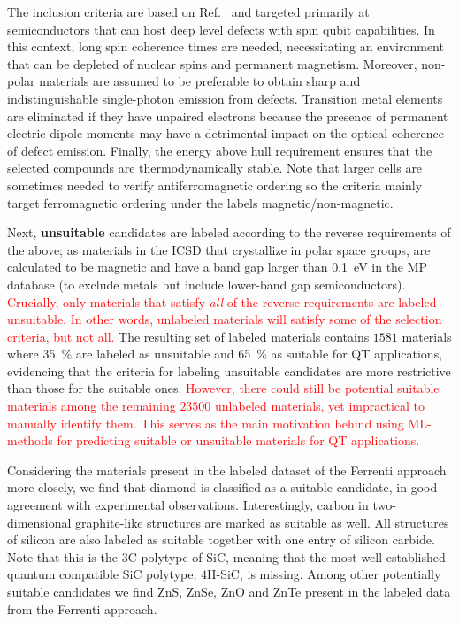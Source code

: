\documentclass[superscriptaddress,
preprint,
 amsmath,amssymb,
 aps,
]{revtex4-2}
\newcommand{\mrk}[1]{\textcolor{red}{#1}}
\begin{document}
The inclusion criteria are based on Ref.~\cite{Weber2010} and targeted primarily at semiconductors that can host deep level defects with spin qubit capabilities. In this context, long spin coherence times are needed, necessitating an environment that can be depleted of nuclear spins and permanent magnetism. 
Moreover, non-polar materials are assumed to be preferable to obtain sharp and indistinguishable single-photon emission from defects.  
Transition metal elements are eliminated if they have unpaired electrons because the presence of permanent electric dipole moments may have a detrimental impact on the optical coherence of defect emission. 
Finally, the energy above hull requirement ensures that the selected compounds are thermodynamically stable.
Note that larger cells are sometimes needed to verify antiferromagnetic ordering so the criteria mainly target ferromagnetic ordering under the labels magnetic/non-magnetic.

Next, \textbf{unsuitable} candidates are labeled according to the reverse requirements of the above; as materials in the ICSD that crystallize in polar space groups, are calculated to be magnetic and have a band gap larger than \SI{0.1}{\electronvolt} in the MP database (to exclude metals but include lower-band gap semiconductors).
\mrk{Crucially, only materials that satisfy \emph{all} of the reverse requirements are labeled unsuitable.
In other words, unlabeled materials will satisfy some of the selection criteria, but not all.}
The resulting set of labeled materials contains $1581$ materials where \SI{35}{\percent}
are labeled as unsuitable and \SI{65}{\percent} 
as suitable for QT applications, evidencing that 
the criteria for labeling unsuitable candidates are more restrictive than those for the suitable ones. \mrk{However, there could still be potential suitable materials among the remaining $23500$ unlabeled materials, yet impractical to manually identify them. This serves as the main motivation behind using ML-methods for predicting suitable or unsuitable materials for QT applications.}


Considering the materials present in the labeled dataset of the Ferrenti approach more closely, we find that diamond is classified as a suitable candidate, in good agreement with experimental observations. Interestingly, carbon in two-dimensional graphite-like structures are marked as suitable as well. All structures of silicon are also labeled as suitable together with one entry of silicon carbide. Note that this is the $3$C polytype of SiC, meaning that the most well-established quantum compatible SiC polytype, $4$H-SiC, is missing. 
Among other potentially suitable candidates we find ZnS, ZnSe, ZnO and ZnTe present in the labeled data from the Ferrenti approach.
\end{document}
